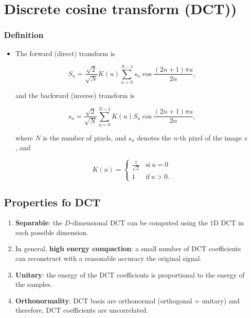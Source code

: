 \section{Discrete cosine transform (DCT))}
\hypertarget{definition}{%
\subsubsection{Definition}\label{definition}}

\begin{itemize}
\item
  The forward (direct) transform is

  \begin{equation}
    S_u = \frac{\sqrt{2}}{\sqrt{N}}
    K(u)\sum_{n=0}^{N-1} s_n\cos\frac{(2n+1)\pi u}{2n},
  \end{equation}

  and the backward (inverse) transform is

  \begin{equation}
    s_n = \frac{\sqrt{2}}{\sqrt{N}}
    \sum_{u=0}^{N-1} K(u)S_u\cos\frac{(2n+1)\pi u}{2n},
  \end{equation}

  where \(N\) is the number of pixels, and \(s_n\) denotes the \(n\)-th
  pixel of the image \(s\), and

  \begin{equation}
    K(u) =
    \left\{
      \begin{array}{ll}
      \frac{1}{\sqrt{2}} & \text{si}~u=0\\
        1 & \text{if}~u>0.
      \end{array}
      \right.
  \end{equation}
\end{itemize}

\subsection{Properties fo DCT}
\begin{enumerate}
\tightlist
\item
  \textbf{Separable}: the \(D\)-dimensional DCT can be computed using
  the \(1\)D DCT in each possible dimension.
\item
  In general, \textbf{high energy compaction}: a small number of DCT
  coefficients can reconstruct with a reasonable accuracy the original
  signal.
\item
  \textbf{Unitary}: the energy of the DCT coefficients is proportional
  to the energy of the samples.
\item
  \textbf{Orthonormality}: DCT basis are orthonormal (orthogonal +
  unitary) and therefore, DCT coefficients are uncorrelated.
\end{enumerate}

